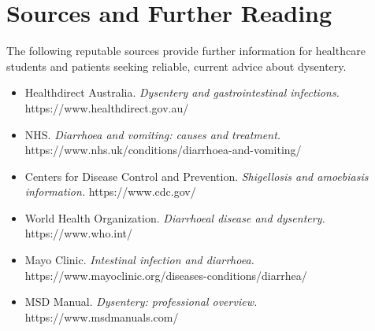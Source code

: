 \section*{Sources and Further Reading}
The following reputable sources provide further information for healthcare students and patients seeking reliable, current advice about dysentery.
\begin{itemize}
    \item Healthdirect Australia. \textit{Dysentery and gastrointestinal infections.} https://www.healthdirect.gov.au/
    \item NHS. \textit{Diarrhoea and vomiting: causes and treatment.} https://www.nhs.uk/conditions/diarrhoea-and-vomiting/
    \item Centers for Disease Control and Prevention. \textit{Shigellosis and amoebiasis information.} https://www.cdc.gov/
    \item World Health Organization. \textit{Diarrhoeal disease and dysentery.} https://www.who.int/
    \item Mayo Clinic. \textit{Intestinal infection and diarrhoea.} https://www.mayoclinic.org/diseases-conditions/diarrhea/
    \item MSD Manual. \textit{Dysentery: professional overview.} https://www.msdmanuals.com/
\end{itemize}
